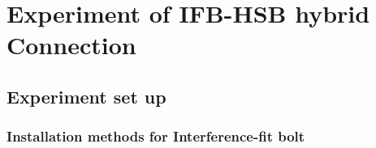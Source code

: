 \chapter{Experiment of IFB-HSB hybrid Connection}
\label{ch6}

\begin{spacing}{1.25} %
\minitoc %
\end{spacing} %
\onehalfspacing %

\kant[1-2]

\section{Experiment set up}

\subsection{Installation methods for Interference-fit bolt}
